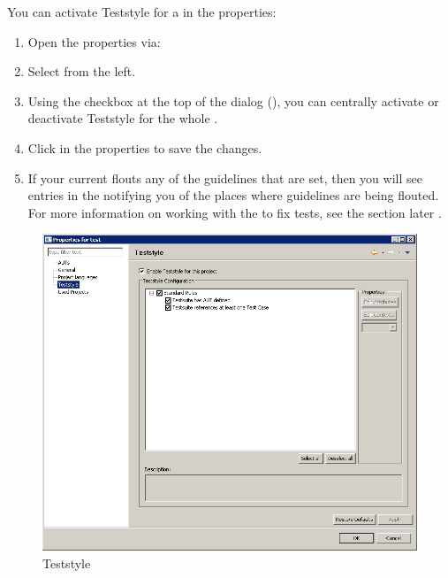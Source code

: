 You can activate Teststyle for a \gdproject{} in the \gdproject{} properties:

\begin{enumerate}
\item Open the \gdproject{} properties via: \\
\item Select  from the left.
\item Using the checkbox at the top of the dialog (), you can centrally activate or deactivate Teststyle for the whole \gdproject{}. 


\item Click  in the \gdproject{} properties to save the changes.
\item If your current \gdproject{} flouts any of the guidelines that are set, then you will see entries in the \gdprobview{} notifying you of the places where guidelines are being flouted. For more information on working with the \gdprobview{} to fix tests, see the section later .


\end{enumerate}

\begin{figure}[p]
\begin{center}
\includegraphics[width=12.5cm]{Tasks/Teststyle/PS/teststyle}
\caption{Teststyle}
\label{teststyle}
\end{center}
\end{figure}
